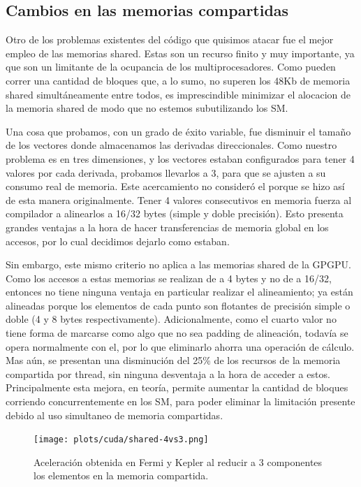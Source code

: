 \subsection{Cambios en las memorias compartidas}
Otro de los problemas existentes del c\'odigo que quisimos atacar fue el mejor empleo de las
memorias shared. Estas son un recurso finito y muy importante, ya que son un limitante de
la ocupancia de los multiprocesadores. Como pueden correr una cantidad de bloques que, a lo sumo,
no superen los 48Kb de memoria shared simult\'aneamente entre todos, es imprescindible minimizar el
alocacion de la memoria shared de modo que no estemos subutilizando los SM.

Una cosa que probamos, con un grado de \'exito variable, fue disminuir el tama\~no de los vectores
donde almacenamos las derivadas direccionales. Como nuestro problema es en tres dimensiones,
y los vectores estaban configurados para tener 4 valores por cada derivada, probamos llevarlos a
3, para que se ajusten a su consumo real de memoria. Este acercamiento no consider\'o el porque
se hizo as\'i de esta manera originalmente. Tener 4 valores consecutivos en memoria fuerza
al compilador a alinearlos a 16/32 bytes (simple y doble precisi\'on).
Esto presenta grandes ventajas a la hora de hacer transferencias de memoria global en los accesos,
por lo cual decidimos dejarlo como estaban.

Sin embargo, este mismo criterio no aplica a las memorias shared de la GPGPU. Como los accesos
a estas memorias se realizan de a 4 bytes y no de a 16/32, entonces no tiene ninguna ventaja
en particular realizar el alineamiento; ya est\'an alineadas porque los elementos de cada punto
son flotantes de precisi\'on simple o doble (4 y 8 bytes respectivamente). Adicionalmente, como el
cuarto valor no tiene forma de marcarse como algo que no sea padding de alineaci\'on, todav\'ia se
opera normalmente con el, por lo que eliminarlo ahorra una operaci\'on de c\'alculo. Mas a\'un,
se presentan una disminuci\'on del 25\% de los recursos de la memoria compartida por thread,
sin ninguna desventaja a la hora de acceder a estos. Principalmente esta mejora, en teor\'ia, permite
aumentar la cantidad de bloques corriendo concurrentemente en los SM, para poder eliminar
la limitaci\'on presente debido al uso simultaneo de memoria compartidas.

\begin{figure}[htbp]
   \centering
   \texttt{[image: plots/cuda/shared-4vs3.png]}
   \caption{Aceleraci\'on obtenida en Fermi y Kepler al reducir a 3 componentes los
   elementos en la memoria compartida.}
   \label{plt:shared4vs3}
\end{figure}

